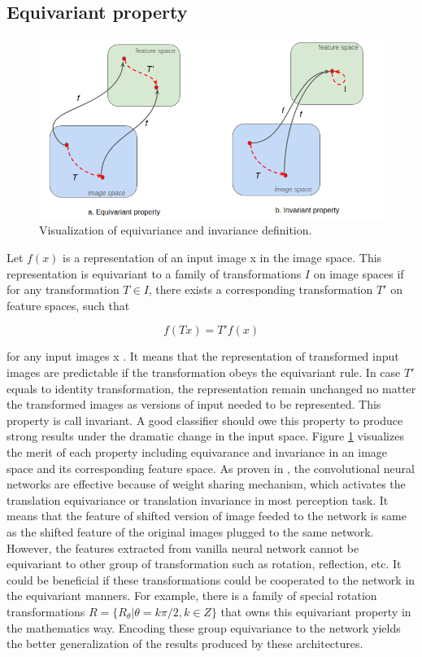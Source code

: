 \subsection{Equivariant property}

\begin{figure}[thb]
    \centering
    \includegraphics[width=\textwidth]{resources/2_equi_invar.png}
    \caption{Visualization of equivariance and invariance definition.}
    \label{fig:equi_and_invar}
\end{figure}


Let $f(x)$ is a representation of an input image x in the image space. This representation is equivariant to a family of transformations $I$ on image spaces if for any transformation $T \in I$, there exists a corresponding transformation $T'$ on feature spaces, such that

\begin{equation}
    f(Tx) = T'f(x)
\end{equation}

for any input images x \cite{dren}. It means that the representation of transformed input images are predictable if the transformation obeys the  equivariant rule. In case $T'$ equals to identity transformation, the representation remain unchanged no matter the transformed images as versions of input needed to be represented. This property is call invariant. A good classifier should owe this property to produce strong results under the dramatic change in the input space. Figure \ref{fig:equi_and_invar} visualizes the merit of each property including equivarance and invariance in an image space and its corresponding feature space. As proven in \cite{gcnn}, the convolutional neural networks are effective because of weight sharing mechanism, which activates the translation equivariance or translation invariance in most perception task. It means that the feature of shifted version of image feeded to the network is same as the shifted feature of the original images plugged to the same network. However, the features extracted from vanilla neural network cannot be equivariant to other group of transformation such as rotation, reflection, etc. It could be beneficial if these transformations could be cooperated to the network in the equivariant manners. For example, there is a family of special rotation transformations $R = \{R_{\theta} | \theta = k\pi/2, k \in Z \}$ that owns this equivariant property in the mathematics way. Encoding these group equivariance to the network yields the better generalization of the results produced by these architectures.


